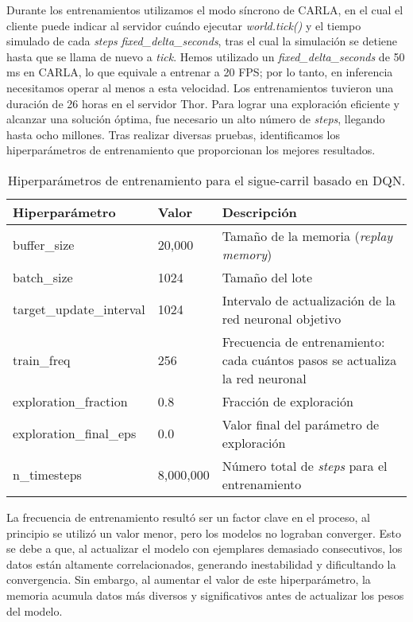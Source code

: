 \newpage

Durante los entrenamientos utilizamos el modo síncrono de CARLA, en el cual el cliente puede indicar al servidor cuándo ejecutar \textit{world.tick()} y el tiempo simulado de cada \textit{steps} \textit{fixed\_delta\_seconds}, tras el cual la simulación se detiene hasta que se llama de nuevo a \textit{tick}. Hemos utilizado un \textit{fixed\_delta\_seconds} de 50 ms en CARLA, lo que equivale a entrenar a 20 \ac{FPS}; por lo tanto, en inferencia necesitamos operar al menos a esta velocidad. Los entrenamientos tuvieron una duración de 26 horas en el servidor Thor. Para lograr una exploración eficiente y alcanzar una solución óptima, fue necesario un alto número de \textit{steps}, llegando hasta ocho millones. Tras realizar diversas pruebas, identificamos los hiperparámetros de entrenamiento que proporcionan los mejores resultados.
\begin{table}[ht]
\centering
\renewcommand{\arraystretch}{1.2} %
\begin{tabular}{|l|l|p{9cm}|} %
\hline
\textbf{Hiperparámetro} & \textbf{Valor} & \textbf{Descripción} \\ \hline
buffer\_size & 20,000 & Tamaño de la memoria (\textit{replay memory}) \\ \hline
batch\_size & 1024 & Tamaño del lote \\ \hline
target\_update\_interval & 1024 & Intervalo de actualización de la red neuronal objetivo \\ \hline
train\_freq & 256 & Frecuencia de entrenamiento: cada cuántos pasos se actualiza la red neuronal \\ \hline
exploration\_fraction & 0.8 & Fracción de exploración \\ \hline
exploration\_final\_eps & 0.0 & Valor final del parámetro de exploración \\ \hline
n\_timesteps & 8,000,000 & Número total de \textit{steps} para el entrenamiento \\ \hline
\end{tabular}
\caption{Hiperparámetros de entrenamiento para el sigue-carril basado en \ac{DQN}.}
\label{tab:hiperparametros}
\end{table}

La frecuencia de entrenamiento resultó ser un factor clave en el proceso, al principio se utilizó un valor menor, pero los modelos no lograban converger. Esto se debe a que, al actualizar el modelo con ejemplares demasiado consecutivos, los datos están altamente correlacionados, generando inestabilidad y dificultando la convergencia. Sin embargo, al aumentar el valor de este hiperparámetro, la memoria acumula datos más diversos y significativos antes de actualizar los pesos del modelo.

